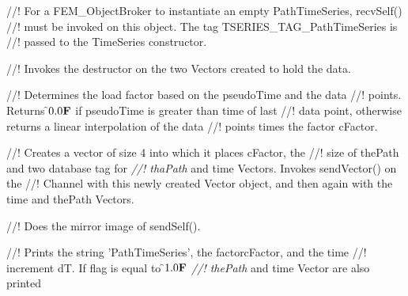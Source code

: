 //! For a FEM\_ObjectBroker to instantiate an empty PathTimeSeries, recvSelf()
//! must be invoked on this object. The tag TSERIES\_TAG\_PathTimeSeries is
//! passed to the TimeSeries constructor.


//! Invokes the destructor on the two Vectors created to hold the data.

//! Determines the load factor based on the \p pseudoTime and the data
//! points. Returns \f$0.0{\bf F}$ if \p pseudoTime is greater than time of last
//! data point, otherwise returns a linear interpolation of the data
//! points times the factor \p cFactor.

//! Creates a vector of size 4 into which it places \p cFactor, the
//! size of \p thePath and two  database tag for {\em 
//! thaPath} and \p time Vectors.  Invokes sendVector() on the
//! Channel with this newly created Vector object, and then again with the
\p time and \p thePath Vectors.

//! Does the mirror image of sendSelf().

//! Prints the string 'PathTimeSeries', the factor\p cFactor, and the time
//! increment \p dT. If \p flag is equal to \f$1.0{\bf F}$ {\em
//! thePath} and \p time Vector are also printed

